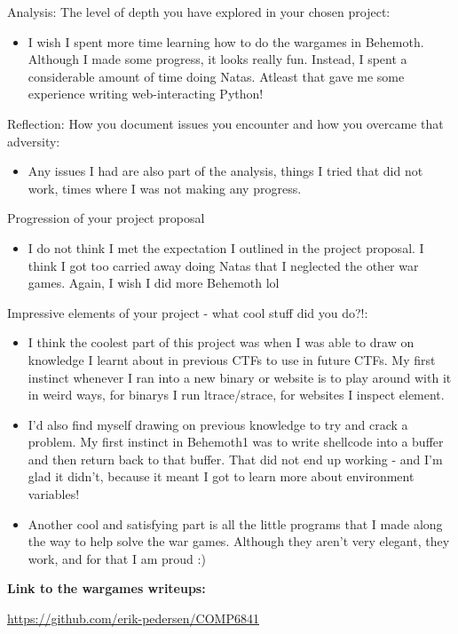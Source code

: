 \documentclass{article}
\begin{document}
Analysis: The level of depth you have explored in your chosen project:

\begin{itemize}
	\item I wish I spent more time learning how to do the wargames in Behemoth. Although I made some progress, it looks really fun. Instead, I spent a considerable amount of time doing Natas. Atleast that gave me some experience writing web-interacting Python!
\end{itemize}

Reflection: How you document issues you encounter and how you overcame that adversity:

\begin{itemize}
	\item Any issues I had are also part of the analysis, things I tried that did not work, times where I was not making any progress.
\end{itemize}

Progression of your project proposal

\begin{itemize}
	\item I do not think I met the expectation I outlined in the project proposal. I think I got too carried away doing Natas that I neglected the other war games. Again, I wish I did more Behemoth lol
\end{itemize}

Impressive elements of your project - what cool stuff did you do?!:

\begin{itemize}
	\item I think the coolest part of this project was when I was able to draw on knowledge I learnt about in previous CTFs to use in future CTFs. My first instinct whenever I ran into a new binary or website is to play around with it in weird ways, for binarys I run ltrace/strace, for websites I inspect element. 
	\item I'd also find myself drawing on previous knowledge to try and crack a problem. My first instinct in Behemoth1 was to write shellcode into a buffer and then return back to that buffer. That did not end up working - and I'm glad it didn't, because it meant I got to learn more about environment variables!
	\item Another cool and satisfying part is all the little programs that I made along the way to help solve the war games. Although they aren't very elegant, they work, and for that I am proud :)
\end{itemize}

\textbf{Link to the wargames writeups:}

\url{https://github.com/erik-pedersen/COMP6841}
\end{document}
